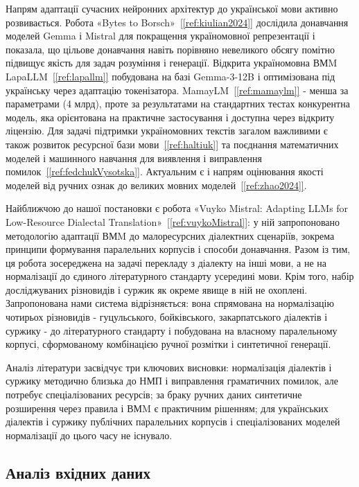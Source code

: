 \documentclass[14pt]{extarticle}
\newcommand{\citeref}[1]{\hyperref[#1]{[\ref*{#1}]}}
\begin{document}
Напрям адаптації сучасних нейронних архітектур до української мови активно розвивається. Робота «Bytes to Borsch»~\citeref{ref:kiulian2024} дослідила донавчання моделей Gemma і Mistral для покращення україномовної репрезентації і показала, що цільове донавчання навіть порівняно невеликого обсягу помітно підвищує якість для задач розуміння і генерації. Відкрита україномовна ВМM LapaLLM~\citeref{ref:lapallm} побудована на базі Gemma-3-12B і оптимізована під українську через адаптацію токенізатора. MamayLM~\citeref{ref:mamaylm} - менша за параметрами (4 млрд), проте за результатами на стандартних тестах конкурентна модель, яка орієнтована на практичне застосування і доступна через відкриту ліцензію. Для задачі підтримки україномовних текстів загалом важливими є також розвиток ресурсної бази мови~\citeref{ref:haltiuk} та поєднання математичних моделей і машинного навчання для виявлення і виправлення помилок~\citeref{ref:fedchukVysotska}. Актуальним є і напрям оцінювання якості моделей від ручних ознак до великих мовних моделей~\citeref{ref:zhao2024}.

Найближчою до нашої постановки є робота «Vuyko Mistral: Adapting LLMs for Low-Resource Dialectal Translation»~\citeref{ref:vuykoMistral}: у ній запропоновано методологію адаптації ВМM до малоресурсних діалектних сценаріїв, зокрема принципи формування паралельних корпусів і способи донавчання. Разом із тим, ця робота зосереджена на задачі перекладу з діалекту на інші мови, а не на нормалізації до єдиного літературного стандарту усередині мови. Крім того, набір досліджуваних різновидів і суржик як окреме явище в ній не охоплені. Запропонована нами система відрізняється: вона спрямована на нормалізацію чотирьох різновидів - гуцульського, бойківського, закарпатського діалектів і суржику - до літературного стандарту і побудована на власному паралельному корпусі, сформованому комбінацією ручної розмітки і синтетичної генерації.

Аналіз літератури засвідчує три ключових висновки: нормалізація діалектів і суржику методично близька до НМП і виправлення граматичних помилок, але потребує спеціалізованих ресурсів; за браку ручних даних синтетичне розширення через правила і ВМM є практичним рішенням; для українських діалектів і суржику публічних паралельних корпусів і спеціалізованих моделей нормалізації до цього часу не існувало.

\subsection{Аналіз вхідних даних}
\end{document}
